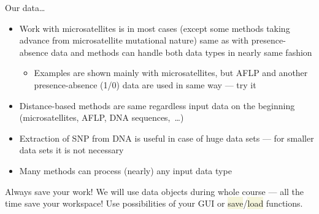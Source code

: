 \documentclass[compress, ucs, xelatex, 11pt, xcolor=svgnames, aspectratio=169,
	hyperref={
		bookmarks=true,
		unicode=true,
		colorlinks=true,
		pdftitle={Molecular data in R},
		plainpages=false,
		pdfauthor={Vojtech Zeisek},
		pdfsubject={Course about phylogeny and evolution in R},
		pdfcreator={XeLaTeX},
		pdfkeywords={R, evolution, phylogeny, molecular data},
		linkcolor=Crimson, %
		anchorcolor=Magenta, %
		citecolor=Magenta, %
		filecolor=Magenta, %
		menucolor=Magenta, %
		urlcolor=DodgerBlue, %
		pdftex},
	url={hyphens, lowtilde} %
	]{beamer}
\renewcommand{\texttt}[1]{\colorbox{Beige}{{\ttfamily #1}}}
\begin{document}
\begin{frame}[allowframebreaks]{Our data\ldots}
\begin{itemize}
\begin{itemize}
		\end{itemize}
		\item Work with microsatellites is in most cases (except some methods taking advance from microsatellite mutational nature) same as with presence-absence data and methods can handle both data types in nearly same fashion
		\begin{itemize}
			\item Examples are shown mainly with microsatellites, but AFLP and another presence-absence (1/0) data are used in same way --- try it
		\end{itemize}
		\item Distance-based methods are same regardless input data on the beginning (microsatellites, AFLP, DNA sequences,~\ldots)
		\item Extraction of SNP from DNA is useful in case of huge data sets --- for smaller data sets it is not necessary
		\item Many methods can process (nearly) any input data type
	\end{itemize}
	\begin{alertblock}{Always save your work!}
		\alert{We will use data objects during whole course --- all the time save your workspace!} Use possibilities of your GUI or \texttt{save}/\texttt{load} functions.
	\end{alertblock}
\end{frame}
\end{document}
